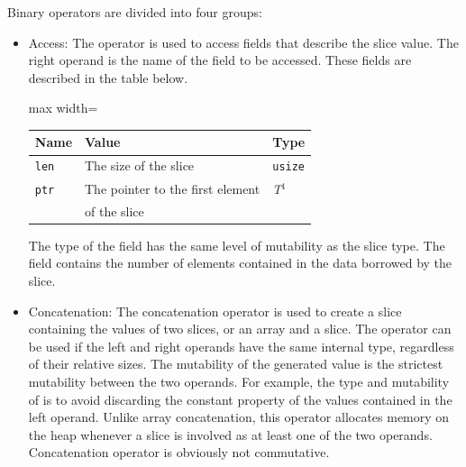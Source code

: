 Binary operators are divided into four groups:
\begin{itemize}
  \setlength\itemsep{-4pt}
\item Access: The operator  is used to access fields that describe the slice value. The right operand is the name of the field to be accessed. These fields are described in the table below.

  \begin{center}\begin{adjustbox}{max width=\linewidth}
      \begin{threeparttable}
        \begin{tabular}{|l|ll|}
          \hline
          Name & Value & Type\\
          \hline
          \hline
          \texttt{len} & The size of the slice & \texttt{usize} \\
          \texttt{ptr} & The pointer to the first element  & \textit{T}$^{1^{\phantom{j}}}$ \\
          & of the slice & \\
          \hline
        \end{tabular}
      \end{threeparttable}
  \end{adjustbox}\end{center}

  The type of the  field has the same level of mutability as the
  slice type. The  field contains the number of elements contained
  in the data borrowed by the slice.

\item Concatenation: The concatenation operator \token{\~} is used to create a
  slice containing the values of two slices, or an array and a slice. The
  operator can be used if the left and right operands have the same internal
  type, regardless of their relative sizes. The mutability of the generated
  value is the strictest mutability between the two operands. For example, the
  type and mutability of  is \token{[*i32]}
  to avoid discarding the constant property of the values contained in the left
  operand. Unlike array concatenation, this operator allocates memory on the
  heap whenever a slice is involved as at least one of the two operands.
  Concatenation operator is obviously not commutative.


\end{itemize}
